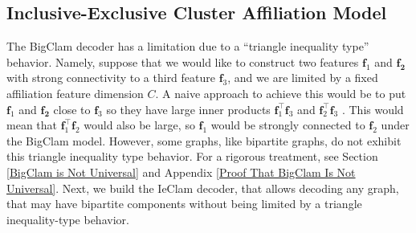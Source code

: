 \documentclass[letterpaper]{article} %
\begin{document}
\subsection{Inclusive-Exclusive Cluster Affiliation Model}






The BigClam decoder has a limitation due to a  ``triangle inequality type'' behavior. Namely, suppose that we would like to construct two features $\mathbf{f}_1$ and $\mathbf{f_2}$ with strong connectivity to a third feature $\mathbf{f}_3$, and  we are limited by a fixed affiliation feature dimension $C$. A naive approach to achieve this would be to put $\mathbf{f}_1$ and $\mathbf{f_2}$ close to $\mathbf{f}_3$ so they have large inner products $\mathbf{f}_1^{\top }\mathbf{f}_3$ and $\mathbf{f}_2^{\top }\mathbf{f}_3$ . This would mean that $\mathbf{f}_1^{\top }\mathbf{f}_2$ would also be large, so $\mathbf{f}_1$ would be strongly connected to  $\mathbf{f}_2$ under the BigClam model. However, some graphs, like bipartite graphs, do not exhibit this triangle inequality type behavior. For a rigorous treatment, see Section \ref{BigClam is Not Universal} and Appendix \ref{Proof That BigClam Is Not Universal}.  Next, we build the IeClam decoder, that allows decoding any graph, that may have bipartite components without being limited by a  triangle inequality-type behavior. 
\end{document}

